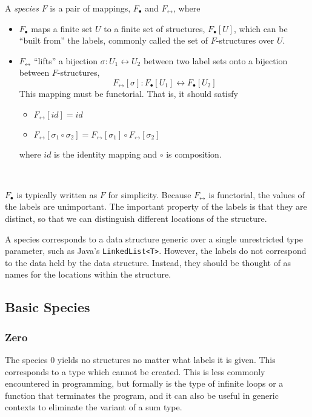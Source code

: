 \documentclass{article}
\begin{document}
\begin{definition}
  A \emph{species} \( F \) is a pair of mappings, \( F_\bullet \) and \( F_\leftrightarrow \), where
  \begin{itemize}
    \item \( F_\bullet \) maps a finite set \( U \) to a finite set of structures, \( F_\bullet [U]
      \), which can be ``built from'' the labels, commonly called the set of \( F \)-structures over
      \( U \).
    \item \( F_\leftrightarrow \) ``lifts'' a bijection \( \sigma : U_1 \leftrightarrow U_2 \)
      between two label sets onto a bijection between \( F \)-structures,
      \[
        F_\leftrightarrow [\sigma] : F_\bullet [U_1] \leftrightarrow F_\bullet [U_2]
      \]
      This mapping must be functorial. That is, it should satisfy
      \begin{itemize}
        \item \( F_\leftrightarrow [id] = id \)
        \item \( F_\leftrightarrow [\sigma_1 \circ \sigma_2]
          = F_\leftrightarrow [\sigma_1] \circ F_\leftrightarrow [\sigma_2] \)
      \end{itemize}
      where \( id \) is the identity mapping and \( \circ \) is composition.
  \end{itemize}~\cite{bergeron, yorgey}
\end{definition}

\( F_\bullet \) is typically written as \( F \) for simplicity. Because \( F_\leftrightarrow \) is
functorial, the values of the labels are unimportant. The important property of the labels is that
they are distinct, so that we can distinguish different locations of the structure.

A species corresponds to a data structure generic over a single unrestricted type parameter, such as
Java's \verb|LinkedList<T>|. However, the labels do not correspond to the data held by the data
structure. Instead, they should be thought of as names for the locations within the structure.

\subsection{Basic Species}
\subsubsection*{Zero}
The species \( 0 \) yields no structures no matter what labels it is given. This corresponds to a
type which cannot be created. This is less commonly encountered in programming, but formally is the
type of infinite loops or a function that terminates the program, and it can also be useful in
generic contexts to eliminate the variant of a sum type.
\end{document}

